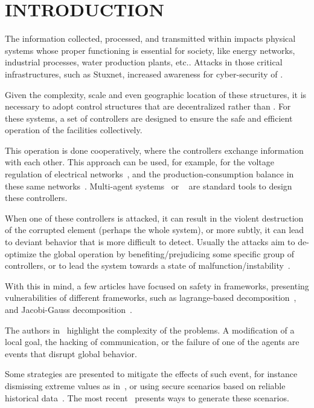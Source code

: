 \documentclass{ifacconf}  %
\begin{document}
\section{INTRODUCTION}
The information collected, processed, and transmitted within \cps{} impacts physical systems whose proper functioning is essential for society, like energy networks, industrial processes, water production plants, etc..
Attacks in those critical infrastructures, such as Stuxnet, increased awareness for cyber-security of \cps{}.

Given the complexity, scale and even geographic location of these structures, it is necessary to adopt control structures that are decentralized rather than .
For these systems, a set of controllers are designed to ensure the safe and efficient operation of the facilities collectively.

This operation is done cooperatively, where the controllers exchange information with each other.
This approach can be used, for example, for the voltage regulation of electrical networks~\citep{HansEtAl2019}, and the production-consumption balance in these same networks~\citep{HerreraEtAl2015}.
Multi-agent systems~\citep{KantamneniEtAl2015} or \dmpc{}~\citep{MaestreEtAl2014} are standard tools to design these controllers.

When one of these controllers is attacked, it can result in the violent destruction of the corrupted element (perhaps the whole system), or more subtly, it can lead to deviant behavior that is more difficult to detect.
Usually the attacks aim to de-optimize the global operation by benefiting/prejudicing some specific group of controllers, or to  lead the system towards a state of malfunction/instability~.

With this in mind, a few articles have focused on safety in \dmpc{} frameworks, presenting vulnerabilities of different frameworks, such as lagrange-based decomposition~\citep{VelardeEtAl2017}, and Jacobi-Gauss decomposition~\citep{ChanfreutEtAl2018}.

The authors in~\cite{VelardeEtAl2017} highlight the complexity of the problems. A modification of a local goal, the hacking of communication,
or the failure of one of the agents are events that disrupt global behavior.

Some strategies are presented to mitigate the effects of such event,
for instance dismissing extreme values as in~\cite{VelardeEtAl2017}, or
using secure scenarios based on reliable historical data~\cite{VelardeEtAl2017a}.
The most recent~\cite{MaestreEtAl2021} presents ways to generate these scenarios.
\end{document}
